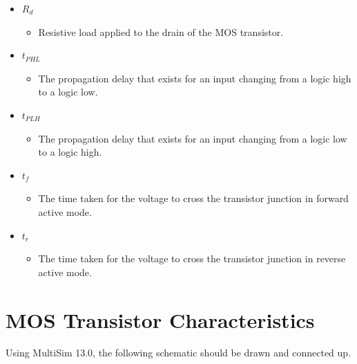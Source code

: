 \documentclass[12pt]{article}
\begin{document}
\begin{itemize}
\item $R_{d}$
\begin{itemize}
\item Resistive load applied to the drain of the MOS transistor.
\end{itemize}
\item $t_{PHL}$
\begin{itemize}
\item The propagation delay that exists for an input changing from a logic high to a logic low.
\end{itemize}
\item $t_{PLH}$
\begin{itemize}
\item The propagation delay that exists for an input changing from a logic low to a logic high.
\end{itemize}
\item $t_{f}$
\begin{itemize}
\item The time taken for the voltage to cross the transistor junction in forward active mode.
\end{itemize}
\item $t_{r}$
\begin{itemize}
\item The time taken for the voltage to cross the transistor junction in reverse active mode.
\end{itemize}
\end{itemize}
\clearpage

\section{MOS Transistor Characteristics}
Using MultiSim 13.0, the following schematic should be drawn and connected up.
\end{document}
